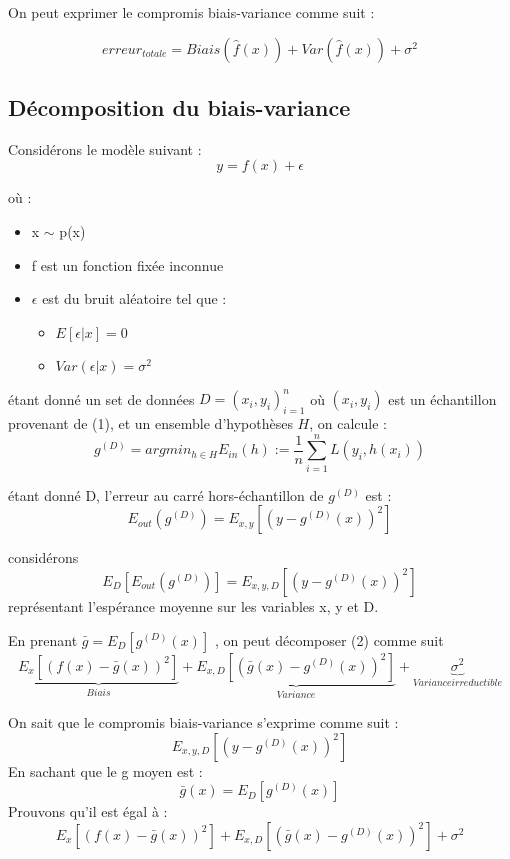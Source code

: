 \documentclass[a4paper]{article}
\begin{document}
On peut exprimer le compromis biais-variance comme suit : \cite{BiasVarianceTradeoffTextbooksUpdate}

\[ erreur_{totale} = Biais(\hat{f}(x)) + Var(\hat{f}(x)) + \sigma^2 \] 

\newpage

\subsection{Décomposition du biais-variance}
\label{decomposition_Biais_Variance_section}

Considérons le modèle suivant : 
\begin{equation}
\label{decomposition_Biais_Variance}
y = f(x) + \epsilon
\end{equation}

où : 

\begin{itemize}
	\item x $\sim$ p(x)
	\item f est un fonction fixée inconnue
	\item $\epsilon$ est du bruit aléatoire tel que :
	\begin{itemize}
		\item $E[\epsilon|x] = 0$
		\item $Var(\epsilon|x) = \sigma^2$
	\end{itemize}
\end{itemize}


étant donné un set de données $D = {(x_i, y_i)}^n_{i=1}$ où $(x_i, y_i)$ est un échantillon provenant de (1), et un ensemble d'hypothèses $H$, on calcule :
\[ g^{(D)} = argmin_{h\in H}  E_{in}(h) := \frac{1}{n} \sum_{i=1}^{n} L(y_i,h(x_i)) \]

étant donné D, l'erreur au carré hors-échantillon de $g^{(D)}$ est :
\[ E_{out}(g^{(D)}) = E_{x,y}[(y - g^{(D)}(x))^2] \]

considérons 
\begin{equation}
E_D[E_{out}(g^{(D)})] = E_{x,y,D}[(y - g^{(D)}(x))^2]
\end{equation}
représentant l'espérance moyenne sur les variables x, y et D.

En prenant $ \bar{g} = E_D[g^{(D)}(x)]$ , on peut décomposer (2) comme suit 
\[ \underbrace{E_x[(f(x) - \bar{g}(x))^2]}_{Biais} + \underbrace{E_{x,D}[(\bar{g}(x) - g^{(D)}(x))^2]}_{Variance} + \underbrace{\sigma^2}_{Variance irreductible} \]

\newpage

On sait que le compromis biais-variance s'exprime comme suit : 
\[ E_{x,y,D}[(y-g^{(D)}(x))^2] \]
En sachant que le g moyen est :
\begin{equation}
\label{g_moyen}
\bar{g}(x) = E_D [g^{(D)}(x)]
\end{equation}
Prouvons qu'il est égal à :
\[ E_x[(f(x) - \bar{g}(x))^2] + E_{x,D}[(\bar{g}(x) - g^{(D)}(x))^2] + \sigma^2 \]
\end{document}

